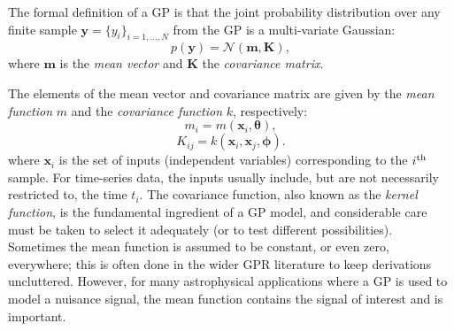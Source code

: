 \documentclass[letterpaper]{ar-1col}
\newcommand{\hyperparams}{\ensuremath{\boldsymbol{\phi}}}
\newcommand{\meanparams}{\ensuremath{\boldsymbol{\theta}}}
\begin{document}
The formal definition of a GP is that the joint probability distribution over any finite sample $\mathbf{y} = \{y_i\}_{i=1,\ldots,N}$ from the GP is a multi-variate Gaussian:
\begin{equation}
\label{eq:gp_def}
    p(\mathbf{y}) = \mathcal{N}(\mathbf{m}, \mathbf{K}),
\end{equation}
where $\mathbf{m}$ is the \emph{mean vector} and $\mathbf{K}$ the \emph{covariance matrix}.

The elements of the mean vector and covariance matrix are given by the \textit{mean function} $m$ and the \textit{covariance function} $k$, respectively:
\begin{equation}
    m_{i} = m(\boldsymbol{x}_i, \meanparams),
\end{equation}
\begin{equation}
    K_{ij} = k(\boldsymbol{x}_i,\boldsymbol{x}_j, \hyperparams).
\end{equation}
where $\boldsymbol{x}_i$ is the set of inputs (independent variables) corresponding to the $i^{\rm th}$ sample. For time-series data, the inputs usually include, but are not necessarily restricted to, the time $t_i$. The covariance function, also known as the \emph{kernel function}, is the fundamental ingredient of a GP model, and considerable care must be taken to select it adequately (or to test different possibilities). Sometimes the mean function is assumed to be constant, or even zero, everywhere; this is often done in the wider GPR literature to keep derivations uncluttered. However, for many astrophysical applications where a GP is used to model a nuisance signal, the mean function contains the signal of interest and is important.

\end{document}
